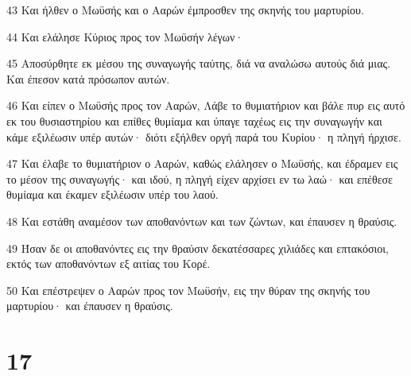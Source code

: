 \par 43 Και ήλθεν ο Μωϋσής και ο Ααρών έμπροσθεν της σκηνής του μαρτυρίου.
\par 44 Και ελάλησε Κύριος προς τον Μωϋσήν λέγων·
\par 45 Αποσύρθητε εκ μέσου της συναγωγής ταύτης, διά να αναλώσω αυτούς διά μιας. Και έπεσον κατά πρόσωπον αυτών.
\par 46 Και είπεν ο Μωϋσής προς τον Ααρών, Λάβε το θυμιατήριον και βάλε πυρ εις αυτό εκ του θυσιαστηρίου και επίθες θυμίαμα και ύπαγε ταχέως εις την συναγωγήν και κάμε εξιλέωσιν υπέρ αυτών· διότι εξήλθεν οργή παρά του Κυρίου· η πληγή ήρχισε.
\par 47 Και έλαβε το θυμιατήριον ο Ααρών, καθώς ελάλησεν ο Μωϋσής, και έδραμεν εις το μέσον της συναγωγής· και ιδού, η πληγή είχεν αρχίσει εν τω λαώ· και επέθεσε θυμίαμα και έκαμεν εξιλέωσιν υπέρ του λαού.
\par 48 Και εστάθη αναμέσον των αποθανόντων και των ζώντων, και έπαυσεν η θραύσις.
\par 49 Ήσαν δε οι αποθανόντες εις την θραύσιν δεκατέσσαρες χιλιάδες και επτακόσιοι, εκτός των αποθανόντων εξ αιτίας του Κορέ.
\par 50 Και επέστρεψεν ο Ααρών προς τον Μωϋσήν, εις την θύραν της σκηνής του μαρτυρίου· και έπαυσεν η θραύσις.

\chapter{17}

